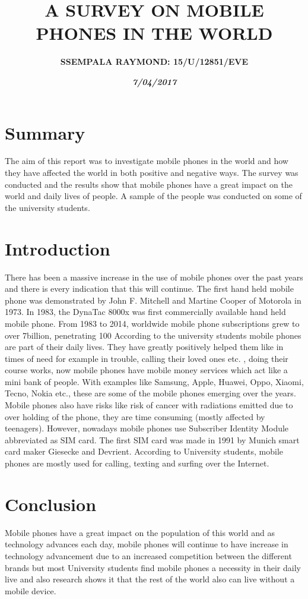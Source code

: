 \documentclass[a4paper,12pt]{report}
\begin{document}
\title{\textbf{A SURVEY ON MOBILE PHONES IN THE WORLD}}
\author{\textbf{SSEMPALA RAYMOND:
		        15/U/12851/EVE}}
\date{\textit{\textbf{7/04/2017}}}
\maketitle
\section{Summary}
{\LARGE The aim of this report was to investigate mobile phones in the world and how they have affected the world in both positive and negative ways.  The survey was conducted and the results show that mobile phones have a great impact on the world and daily lives of people. A sample of the people was conducted on some of the university students.}

\section{Introduction}
{\LARGE  There has been a massive increase in the use of mobile phones over the past years and there is every indication that this will continue. The first hand held mobile phone was demonstrated by John F. Mitchell and Martine Cooper of Motorola in 1973. In 1983, the DynaTac 8000x was first commercially available hand held mobile phone. From 1983 to 2014, worldwide mobile phone subscriptions grew to over 7billion, penetrating 100%
According to the university students mobile phones are part of their daily lives. They have greatly positively helped them like in times of need for example in trouble, calling their loved ones etc. , doing their course works, now mobile phones have mobile money services which act like a mini bank of people. With examples like Samsung, Apple, Huawei, Oppo, Xiaomi, Tecno, Nokia etc., these are some of the mobile phones emerging over the years. Mobile phones also have risks like risk of cancer with radiations emitted due to over holding of the phone, they are time consuming (mostly affected by teenagers).
However, nowadays mobile phones use Subscriber Identity Module abbreviated as SIM card. The first SIM card was made in 1991 by Munich smart card maker Giesecke and Devrient. According to University students, mobile phones are mostly used for calling, texting and surfing over the Internet.
}
\section{Conclusion}
{\LARGE  Mobile phones have a great impact on the population of this world and as technology advances each day, mobile phones will continue to have increase in technology advancement due to an increased competition between the different brands but most University students find mobile phones a necessity in their daily live and also research shows it that the rest of the world also can live without a mobile device.}
\end{document}
